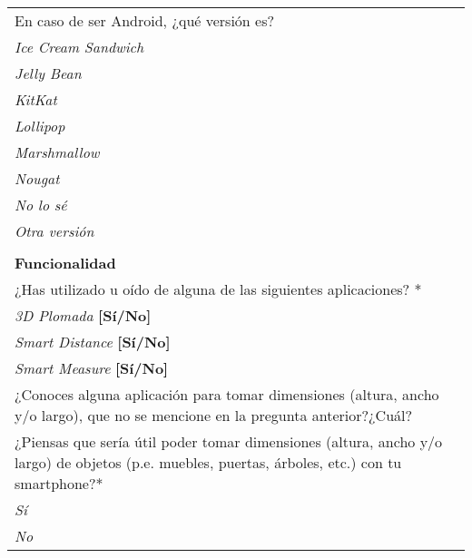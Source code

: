 \begin{center}
\begin{tabular}{|p{16cm}|}
        	 \hline
    \end{tabular}
    \newpage
    \begin{tabular}{|p{16cm}|}
        	 \hline
        	 En caso de ser Android, ¿qué versión es?\\
        	 \hspace{1cm}\textit{Ice Cream Sandwich}\\
            \hspace{1cm}\textit{Jelly Bean}\\
        	 \hspace{1cm}\textit{KitKat}\\
        	 \hspace{1cm}\textit{Lollipop}\\
        	 \hspace{1cm}\textit{Marshmallow}\\
        	 \hspace{1cm}\textit{Nougat}\\
        	 \hspace{1cm}\textit{No lo sé}\\
        	 \hspace{1cm}\textit{Otra versión}\\
        	 \hline
            \rowcolor[rgb]{0.8,0.8,0.8}\\
            \rowcolor[rgb]{0.8,0.8,0.8}
            \textbf{\color{darkgray}Funcionalidad} \\ [0.3cm]
            ¿Has utilizado u oído de alguna de las siguientes aplicaciones? \textcolor{rojo}{*}\\
            \hspace{1cm}\textit{3D Plomada} \textbf{[Sí/No]}\\
            \hspace{1cm}\textit{Smart Distance} \textbf{[Sí/No]}\\
        	 \hspace{1cm}\textit{Smart Measure} \textbf{[Sí/No]}\\
	 \hline
	 ¿Conoces alguna aplicación para tomar dimensiones (altura, ancho y/o largo), que no se mencione
	  en la pregunta anterior?¿Cuál?\\
	  \hline
	  ¿Piensas que sería útil poder tomar dimensiones (altura, ancho y/o largo) de objetos
	   (p.e. muebles, puertas, árboles, etc.) con tu smartphone?\textcolor{rojo}{*}\\
	   \hspace{1cm}\textit{Sí}\\
	   \hspace{1cm}\textit{No}\\

\end{tabular}
\end{center}
